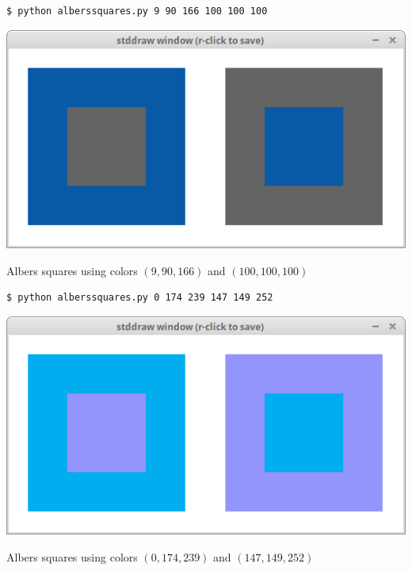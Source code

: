 \documentclass[8pt,a4paper,compress,handout]{beamer}
\begin{document}
\begin{frame}[fragile]
\begin{minipage}{180pt}
\begin{lstlisting}[language={}]
$ python alberssquares.py 9 90 166 100 100 100
\end{lstlisting}
\end{minipage}%
\hfill
\begin{minipage}{120pt}
\begin{center}
\includegraphics[scale=0.17]{figures/albers1.png}

\smallskip

\tiny Albers squares using colors $(9, 90, 166)$ and $(100, 100, 100)$
\end{center}
\end{minipage}

\bigskip

\begin{minipage}{180pt}
\begin{lstlisting}[language={}]
$ python alberssquares.py 0 174 239 147 149 252
\end{lstlisting}
\end{minipage}%
\hfill
\begin{minipage}{120pt}
\begin{center}
\includegraphics[scale=0.17]{figures/albers2.png}

\smallskip

\tiny Albers squares using colors $(0, 174, 239)$ and $(147, 149, 252)$
\end{center}
\end{minipage}
\end{frame}
\end{document}
